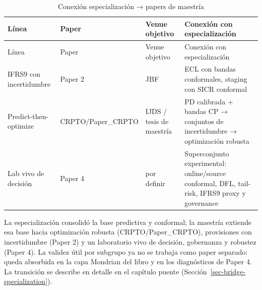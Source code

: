 \documentclass[
  spanish,
  11pt,
  letterpaper,
]{scrbook}
\theoremstyle{plain}
\theoremstyle{remark}
\begin{document}
\begin{longtable}[]{@{}
  >{\raggedright\arraybackslash}p{}
  >{\raggedright\arraybackslash}p{}
  >{\raggedright\arraybackslash}p{}
  >{\raggedright\arraybackslash}p{}@{}}
\caption{Conexión especialización → papers de
maestría}\label{tbl-snapshot-papers}\tabularnewline
\toprule\noalign{}
\begin{minipage}[b]{\linewidth}\raggedright
Línea
\end{minipage} & \begin{minipage}[b]{\linewidth}\raggedright
Paper
\end{minipage} & \begin{minipage}[b]{\linewidth}\raggedright
Venue objetivo
\end{minipage} & \begin{minipage}[b]{\linewidth}\raggedright
Conexión con especialización
\end{minipage} \\
\midrule\noalign{}
\endfirsthead
\toprule\noalign{}
\begin{minipage}[b]{\linewidth}\raggedright
Línea
\end{minipage} & \begin{minipage}[b]{\linewidth}\raggedright
Paper
\end{minipage} & \begin{minipage}[b]{\linewidth}\raggedright
Venue objetivo
\end{minipage} & \begin{minipage}[b]{\linewidth}\raggedright
Conexión con especialización
\end{minipage} \\
\midrule\noalign{}
\endhead
\bottomrule\noalign{}
\endlastfoot
IFRS9 con incertidumbre & Paper 2 & JBF & ECL con bandas conformales,
staging con SICR conformal \\
Predict-then-optimize & CRPTO/Paper\_CRPTO & IJDS / tesis de maestría &
PD calibrada + bandas CP → conjuntos de incertidumbre → optimización
robusta \\
Lab vivo de decisión & Paper 4 & por definir & Superconjunto
experimental: online/source conformal, DFL, tail-risk, IFRS9 proxy y
governance \\
\end{longtable}

La especialización consolidó la base predictiva y conformal; la maestría
extiende esa base hacia optimización robusta (CRPTO/Paper\_CRPTO),
provisiones con incertidumbre (Paper 2) y un laboratorio vivo de
decisión, gobernanza y robustez (Paper 4). La validez útil por subgrupo
ya no se trabaja como paper separado: queda absorbida en la capa
Mondrian del libro y en los diagnósticos de Paper 4. La transición se
describe en detalle en el capítulo puente
(Sección~\ref{sec-bridge-specialization}).
\end{document}
